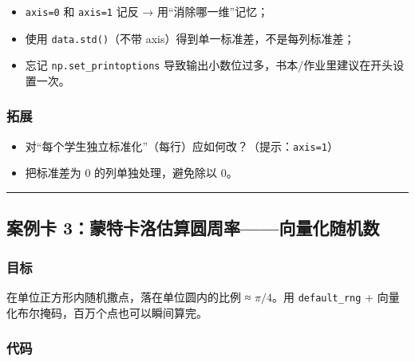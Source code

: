 \begin{itemize}
\tightlist
\item
  \texttt{axis=0} 和 \texttt{axis=1} 记反 → 用``消除哪一维''记忆；
\item
  使用 \texttt{data.std()}（不带 axis）得到单一标准差，不是每列标准差；
\item
  忘记 \texttt{np.set\_printoptions}
  导致输出小数位过多，书本/作业里建议在开头设置一次。
\end{itemize}

\subsubsection{拓展}\label{ux62d3ux5c55-1}

\begin{itemize}
\tightlist
\item
  对``每个学生独立标准化''（每行）应如何改？（提示：\texttt{axis=1}）
\item
  把标准差为 0 的列单独处理，避免除以 0。
\end{itemize}

\begin{center}\rule{0.5\linewidth}{0.5pt}\end{center}

\subsection{案例卡
3：蒙特卡洛估算圆周率------向量化随机数}\label{ux6848ux4f8bux5361-3ux8499ux7279ux5361ux6d1bux4f30ux7b97ux5706ux5468ux7387ux5411ux91cfux5316ux968fux673aux6570}

\subsubsection{目标}\label{ux76eeux6807-2}

在单位正方形内随机撒点，落在单位圆内的比例 ≈ \(\pi/4\)。用
\texttt{default\_rng} + 向量化布尔掩码，百万个点也可以瞬间算完。

\subsubsection{代码}\label{ux4ee3ux7801-2}

